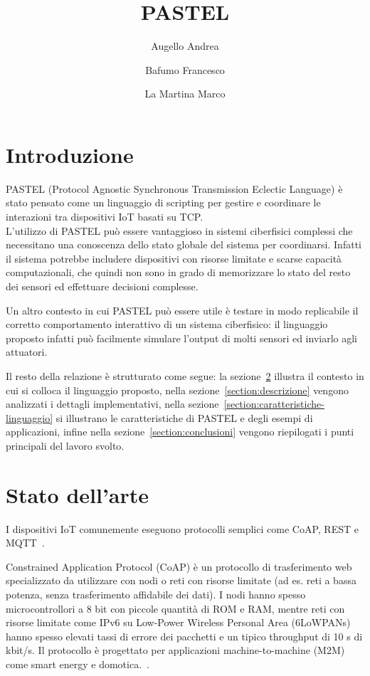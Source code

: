 \documentclass[10pt]{article}
\title{PASTEL}
\author{{Augello Andrea} \and {Bafumo Francesco} \and{La Martina Marco}}
\begin{document}
\maketitle
\tableofcontents
\clearpage



\section{Introduzione}
PASTEL (Protocol Agnostic Synchronous Transmission Eclectic Language) è stato pensato come un linguaggio di scripting per gestire e coordinare le interazioni tra dispositivi IoT basati su TCP.\\
L'utilizzo di PASTEL può essere vantaggioso in sistemi ciberfisici complessi che necessitano una conoscenza dello stato globale del sistema per coordinarsi. Infatti il sistema potrebbe includere dispositivi con risorse limitate e scarse capacità computazionali, che quindi non sono in grado di memorizzare lo stato del resto dei sensori ed effettuare decisioni complesse. 

Un altro contesto in cui PASTEL può essere utile è testare in modo replicabile il corretto comportamento interattivo di un sistema ciberfisico: il linguaggio proposto infatti può facilmente simulare l'output di molti sensori ed inviarlo agli attuatori.

Il resto della relazione è strutturato come segue: la sezione~\ref{section:stato-arte} illustra il contesto in cui si colloca il linguaggio proposto, nella sezione~\ref{section:descrizione} vengono analizzati i dettagli implementativi, nella sezione~\ref{section:caratteristiche-linguaggio} si illustrano le caratteristiche di PASTEL e degli esempi di applicazioni, infine nella sezione~\ref{section:conclusioni} vengono riepilogati i punti principali del lavoro svolto.



\section{Stato dell'arte}\label{section:stato-arte}

I dispositivi IoT comunemente eseguono protocolli semplici come CoAP, REST e MQTT~\cite{tandale2017empirical}. 

Constrained Application Protocol (CoAP) è un   protocollo di trasferimento web specializzato da utilizzare con nodi o reti con risorse limitate (ad es. reti a bassa potenza, senza trasferimento affidabile dei dati). I nodi hanno spesso microcontrollori  a 8 bit con piccole quantità di ROM e RAM, mentre reti con risorse limitate come IPv6 su Low-Power Wireless Personal Area  (6LoWPANs) hanno spesso elevati tassi di errore dei pacchetti e un tipico throughput di 10 s di kbit/s. Il protocollo è progettato per applicazioni  machine-to-machine (M2M) come smart energy e domotica.~\cite{shelby2014constrained}.
\end{document}
